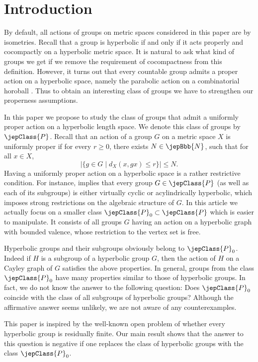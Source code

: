 \section{Introduction}
By default, all actions of groups on metric spaces considered in this paper are by isometries. Recall that a group is hyperbolic if and only if it acts properly and cocompactly on a hyperbolic metric space. It is natural to ask what kind of groups we get if we remove the requirement of cocompactness from this definition. However, it turns out that every countable group admits a proper action on a hyperbolic space,
namely the parabolic action on a combinatorial horoball \cite{ref13}. Thus to obtain an interesting class of groups we have to strengthen our properness assumptions.

In this paper we propose to study the class of groups that admit a uniformly proper action on a hyperbolic length space. We denote this class of groups by $\jepClass{P}$. Recall that an action of a group $G$ on a metric space $X$ is uniformly proper if for every $r\geqslant0$, there exists $N\in\jepBbb{N}$, such that for all $x\in X$,
\[
|\{g\in G\mid d_X(x,gx)\leqslant r\}|\leqslant N.
\]
Having a uniformly proper action on a hyperbolic space is a rather restrictive condition. For instance, \cite[Th.\,1.2]{ref16} implies that every group $G\in\jepClass{P}$ (as well as each of its subgroups) is either virtually cyclic or acylindrically hyperbolic, which imposes strong restrictions on the algebraic structure of $G$. In this article we actually focus on a smaller class $\jepClass{P}_0\subset\jepClass{P}$ which is easier to manipulate. It consists of all groups $G$ having an action on a hyperbolic graph with bounded valence, whose restriction to the vertex set is free.

Hyperbolic groups and their subgroups obviously belong to $\jepClass{P}_0$. Indeed if $H$ is a subgroup of a hyperbolic group $G$, then the action of $H$ on a Cayley graph of $G$ satisfies the above properties. In general, groups from the class $\jepClass{P}_0$ have many properties similar to those of hyperbolic groups. In fact, we do not know the answer to the following question: Does $\jepClass{P}_0$ coincide with the class of all subgroups of hyperbolic groups? Although the affirmative answer seems unlikely, we are not aware of any counterexamples.

This paper is inspired by the well-known open problem of whether every hyperbolic group is residually finite. Our main result shows that the answer to this question is negative if one replaces the class of hyperbolic groups with the class $\jepClass{P}_0$.

